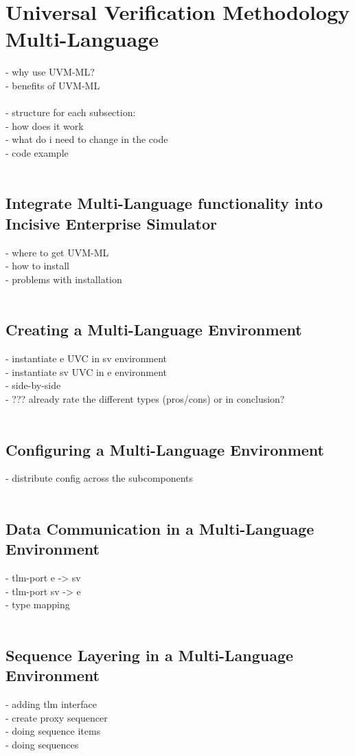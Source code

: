 \section{Universal Verification Methodology Multi-Language}\label{uvm_ml}
- why use UVM-ML?\\
- benefits of UVM-ML\\
\\
- structure for each subsection:\\
- how does it work\\
- what do i need to change in the code\\
- code example\\
\\
\subsection{Integrate Multi-Language functionality into Incisive Enterprise
Simulator}
- where to get UVM-ML\\
- how to install\\
- problems with installation\\
\\
\subsection{Creating a Multi-Language Environment}
- instantiate e UVC in sv environment\\
- instantiate sv UVC in e environment\\
- side-by-side \\
- ??? already rate the different types (pros/cons) or in conclusion?\\
\\
\subsection{Configuring a Multi-Language Environment}
- distribute config across the subcomponents\\
\\
\subsection{Data Communication in a Multi-Language Environment}
- tlm-port e -> sv\\
- tlm-port sv -> e\\
- type mapping\\
\\
\subsection{Sequence Layering in a Multi-Language Environment}
- adding tlm interface\\
- create proxy sequencer\\
- doing sequence items\\
- doing sequences\\